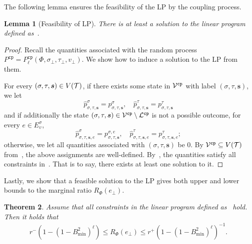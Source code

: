 \documentclass[11pt]{article}
\newtheorem{theorem}{Theorem}
\newtheorem{lemma}[theorem]{Lemma}
\newtheorem*{remark}{Remark}
\def\!#1{\mathtt{#1}}
\def\cp{\!{cp}}
\newcommand{\wh}[1]{\widehat{#1}}
\newcommand{\seqS}{\boldsymbol{s}}
\begin{document}
The following lemma ensures the feasibility of the LP by the coupling process.
\begin{lemma}[Feasibility of LP] \label{lem:feasibility-of-LP}
    There is at least a solution to the linear program defined as~.
\end{lemma}
\begin{proof}
    Recall the quantities associated with the random process $P^{\cp} = P_{\ell}^{\cp}(\Phi, \sigma_\bot, \tau_\bot, v_\bot)$. We show how to induce a solution to the LP from them.

    For every $(\sigma, \tau, \seqS) \in V(\+T)$, if there exists some state in $\+V^{\cp}$ with label $(\sigma, \tau, \seqS)$, we let
    $$
        \wh{p}_{\sigma, \tau, \seqS}^{\sigma} = p_{\sigma, \tau, \seqS}^{\sigma}, \quad \wh{p}_{\sigma, \tau, \seqS}^{\tau} = p_{\sigma, \tau, \seqS}^{\tau}
    $$
    and if additionally the state $(\sigma, \tau, \seqS) \in \+V^{\cp} \setminus \+L^{\cp}$ is not a possible outcome, for every $e \in E_v^{\sigma}$,
    $$
        \wh{p}_{\sigma, \tau, \seqS, e}^{\sigma} = p_{\sigma, \tau, \seqS}^{\sigma, e}, \quad \wh{p}_{\sigma, \tau, \seqS, e}^{\tau} = p_{\sigma, \tau, \seqS, e}^{\tau};
    $$
    otherwise, we let all quantities associated with $(\sigma, \tau, \seqS)$ be $0$. By $\+V^{\cp} \subseteq V(\+T)$ from~, the above assignments are well-defined. By~, the quantities satisfy all constraints in~. That is to say, there exists at least one solution to it.
\end{proof}

Lastly, we show that a feasible solution to the LP gives both upper and lower bounds to the marginal ratio $R_{\Phi}(e_\bot)$.

\begin{theorem} \label{thm:ratio-bound-by-LP}
    Assume that all constraints in the linear program defined as~ hold. Then it holds that
    \begin{align*}
        r^{-} \left(1 - \left(1 - B_{\min}^2\right)^{\ell}\right)\le R_{\Phi}(e_\bot) \le {r^+}\left(1 - \left(1 - B_{\min}^2\right)^{\ell}\right)^{-1}.
    \end{align*}
\end{theorem}
\end{document}
